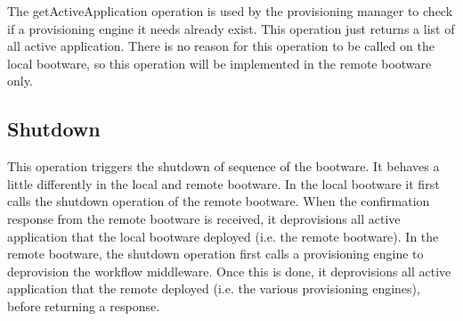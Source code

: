 The getActiveApplication operation is used by the provisioning manager to check if a provisioning engine it needs already exist.
This operation just returns a list of all active application.
There is no reason for this operation to be called on the local bootware, so this operation will be implemented in the remote bootware only.

\subsection{Shutdown}

This operation triggers the shutdown of sequence of the bootware.
It behaves a little differently in the local and remote bootware.
In the local bootware it first calls the shutdown operation of the remote bootware.
When the confirmation response from the remote bootware is received, it deprovisions all active application that the local bootware deployed (i.e. the remote bootware).
In the remote bootware, the shutdown operation first calls a provisioning engine to deprovision the workflow middleware.
Once this is done, it deprovisions all active application that the remote deployed (i.e. the various provisioning engines), before returning a response.
